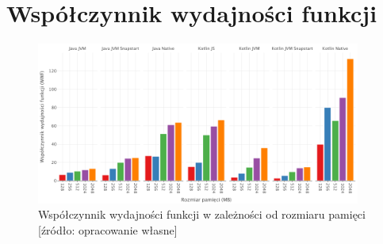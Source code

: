 \section{Współczynnik wydajności funkcji}\label{chapter:results_wwf}

\begin{figure}[h]
    \centering
    \includegraphics[width=0.95\textwidth]{charts/results/wwf.png}
    \caption{Współczynnik wydajności funkcji w zależności od rozmiaru pamięci [źródło: opracowanie własne]}
    \label{fig:lambda_workflow}
\end{figure}
